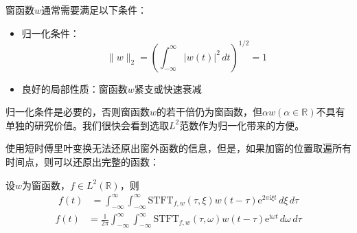 窗函数$w$通常需要满足以下条件：
\begin{itemize}
    \item 归一化条件：
    \[\|w\|_2=\left(\int_{-\infty}^{\infty}|w(t)|^2\,dt\right)^{1/2}=1\]
    \item 良好的局部性质：窗函数$w$紧支或快速衰减
\end{itemize}

归一化条件是必要的，否则窗函数$w$的若干倍仍为窗函数，但$\alpha w(\alpha\in\mathbb{R})$不具有单独的研究价值。我们很快会看到选取$L^2$范数作为归一化带来的方便。

使用短时傅里叶变换无法还原出窗外函数的信息，但是，如果加窗的位置取遍所有时间点，则可以还原出完整的函数：

\begin{theorem}[短时傅里叶反演公式]
    设$w$为窗函数，$f\in L^2(\mathbb{R})$，则
    {\color{blue}\begin{align*}
        f(t)&=\int_{-\infty}^{\infty}\int_{-\infty}^{\infty}\mathrm{STFT} _{f,w}(\tau,\xi)w(t-\tau)\mathrm{e}^{2\pi \mathrm{i} \xi t}\,d\xi\,d\tau
    \end{align*}}
    {\color{red}\begin{align*}
        f(t)&=\frac{1}{2\pi}\int_{-\infty}^{\infty}\int_{-\infty}^{\infty}\mathrm{STFT} _{f,w}(\tau,\omega)w(t-\tau)\mathrm{e}^{\mathrm{i} \omega t}\,d\omega\,d\tau
    \end{align*}}
\end{theorem}
